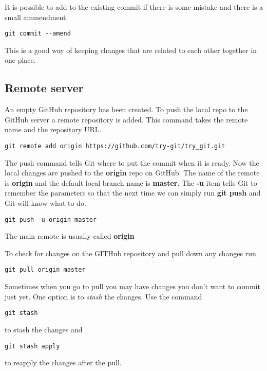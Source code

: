 \documentclass[11pt]{article} %
\begin{document}
It is possible to add to the existing commit if there is some mistake and there is a small ammendment. 

\begin{lstlisting}
git commit --amend 
\end{lstlisting}

This is a good way of keeping changes that are related to each other together in one place. 

\subsection{Remote server}
An empty GitHub repository has been created.  To push the local repo to the GitHub server a remote repository is added.  This command takes the remote name and the repository URL.  

\begin{lstlisting}
git remote add origin https://github.com/try-git/try_git.git 
\end{lstlisting}

The push command tells Git where to put the commit when it is ready. Now the local changes are pushed to the \textbf{origin} repo on GitHub.  The name of the remote is \textbf{origin} and the default local branch name is \textbf{master}.  The \textbf{-u} item tells Git to remember the parameters so that the next time we can simply run \textbf{git push} and Git will know what to do. 

\begin{lstlisting}
git push -u origin master 
\end{lstlisting}

 
The main remote is usually called \textbf{origin}

To check for changes on the GITHub repository and pull down any changes run

\begin{lstlisting}
git pull origin master   
\end{lstlisting}

Sometimes when you go to pull you may have changes you don't want to commit just yet.  One option is to \emph{stash} the changes.  Use the command 

\begin{lstlisting}
git stash 
\end{lstlisting}
to stash the changes and 
\begin{lstlisting}
git stash apply  
\end{lstlisting}
to reapply the changes after the pull.
\end{document}

